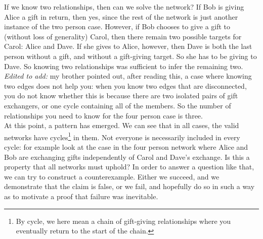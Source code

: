 \documentclass{article}
\begin{document}
If we know two relationships, then can we solve the network? If Bob is giving Alice a gift in return, then yes, since the rest of the network is just another instance of the two person case. However, if Bob chooses to give a gift to (without loss of generality) Carol, then there remain two possible targets for Carol: Alice and Dave. If she gives to Alice, however, then Dave is both the last person without a gift, and without a gift-giving target. So she has to be giving to Dave. So knowing two relationships was sufficient to infer the remaining two.\\

\textit{Edited to add:} my brother pointed out, after reading this, a case where knowing two edges does not help you: when you know two edges that are disconnected, you do not know whether this is because there are two isolated pairs of gift exchangers, or one cycle containing all of the members. So the number of relationships you need to know for the four person case is three.\\

At this point, a pattern has emerged. We can see that in all cases, the valid networks have cycles\footnote{By cycle, we here mean a chain of gift-giving relationships where you eventually return to the start of the chain.} in them. Not everyone is necessarily included in every cycle: for example look at the case in the four person network where Alice and Bob are exchanging gifts independently of Carol and Dave's exchange. Is this a property that all networks must uphold? In order to answer a question like that, we can try to construct a counterexample. Either we succeed, and we demonstrate that the claim is false, or we fail, and hopefully do so in such a way as to motivate a proof that failure was inevitable.\\
\end{document}
